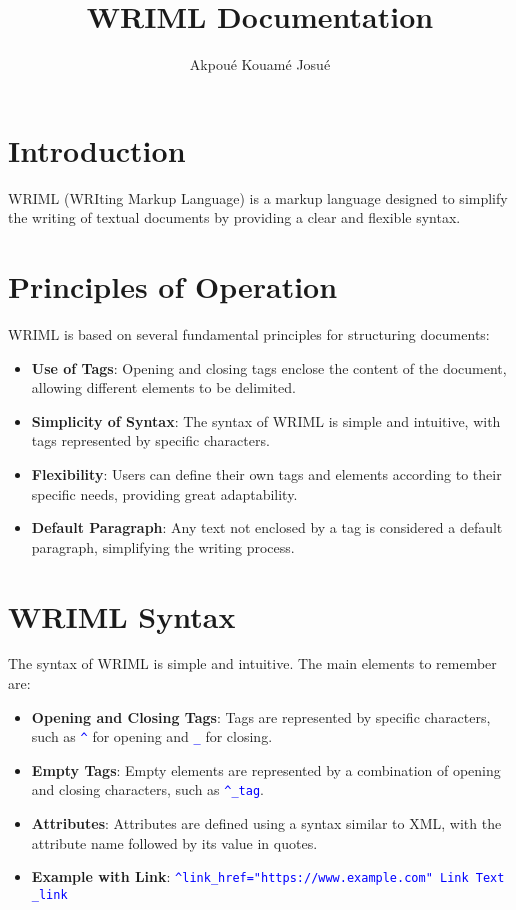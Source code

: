 \documentclass{article}
\title{WRIML Documentation}
\author{Akpoué Kouamé Josué}
\date{\displaydate{todaydate}}
\begin{document}
\maketitle

\section{Introduction}
WRIML (WRIting Markup Language) is a markup language designed to simplify the writing of textual documents by providing a clear and flexible syntax.

\section{Principles of Operation}
WRIML is based on several fundamental principles for structuring documents:

\begin{itemize}
    \item \textbf{Use of Tags}: Opening and closing tags enclose the content of the document, allowing different elements to be delimited.
    \item \textbf{Simplicity of Syntax}: The syntax of WRIML is simple and intuitive, with tags represented by specific characters.
    \item \textbf{Flexibility}: Users can define their own tags and elements according to their specific needs, providing great adaptability.
    \item \textbf{Default Paragraph}: Any text not enclosed by a tag is considered a default paragraph, simplifying the writing process.
\end{itemize}

\section{WRIML Syntax}
The syntax of WRIML is simple and intuitive. The main elements to remember are:

\begin{itemize}
    \item \textbf{Opening and Closing Tags}: Tags are represented by specific characters, such as \textcolor{blue}{\texttt{\textasciicircum}} for opening and \textcolor{blue}{\texttt{\_}} for closing.
    \item \textbf{Empty Tags}: Empty elements are represented by a combination of opening and closing characters, such as \textcolor{blue}{\texttt{\textasciicircum\_tag}}.
    \item \textbf{Attributes}: Attributes are defined using a syntax similar to XML, with the attribute name followed by its value in quotes.
    \item \textbf{Example with Link}: \textcolor{blue}{\texttt{\textasciicircum link\_href="https://www.example.com" Link Text \_link}}
\end{itemize}
\end{document}
